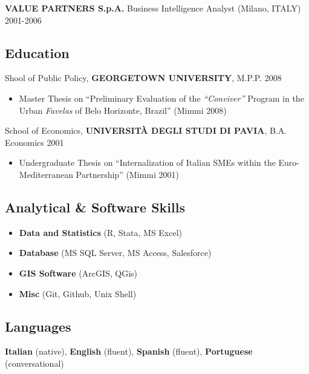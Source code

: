 \documentclass[]{article}
\providecommand{\tightlist}{%
  \setlength{\itemsep}{0pt}\setlength{\parskip}{0pt}}
\begin{document}
\textbf{VALUE PARTNERS S.p.A.} Business Intelligence Analyst (Milano,
ITALY) \hfill 2001-2006

\hypertarget{education}{%
\subsection{Education}\label{education}}

Shool of Public Policy, \textbf{GEORGETOWN UNIVERSITY}, M.P.P.
\hfill 2008

\begin{itemize}
\tightlist
\item
  Master Thesis on ``Preliminary Evaluation of the \emph{``Conviver''}
  Program in the Urban \emph{Favelas} of Belo Horizonte, Brazil'' (Mimmi
  2008)
\end{itemize}

School of Economics, \textbf{UNIVERSITÀ DEGLI STUDI DI PAVIA}, B.A.
Economics \hfill 2001

\begin{itemize}
\tightlist
\item
  Undergraduate Thesis on ``Internalization of Italian SMEs within the
  Euro-Mediterranean Partnership'' (Mimmi 2001)
\end{itemize}

\hypertarget{analytical-software-skills}{%
\subsection{Analytical \& Software
Skills}\label{analytical-software-skills}}

\begin{itemize}
\tightlist
\item
  \textbf{Data and Statistics} (R, Stata, MS Excel)
\item
  \textbf{Database} (MS SQL Server, MS Access, Salesforce)
\item
  \textbf{GIS Software} (ArcGIS, QGis)
\item
  \textbf{Misc} (Git, Github, Unix Shell)
\end{itemize}

\hypertarget{languages}{%
\subsection{Languages}\label{languages}}

\textbf{Italian} (native), \textbf{English} (fluent), \textbf{Spanish}
(fluent), \textbf{Portuguese} (conversational)
\end{document}
